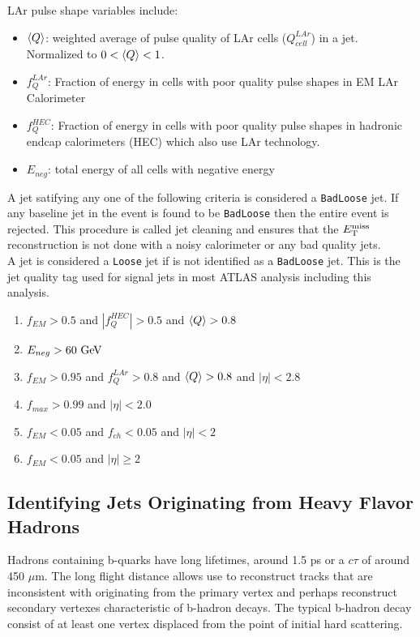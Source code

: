 \indent LAr pulse shape variables include: \\

\begin{itemize}
\item[] $\braket{Q}$: weighted average of pulse quality of LAr cells ($Q^{LAr}_{cell}$) in a jet.  Normalized to $0 < \braket{Q} < 1$.
\item[] $f^{LAr}_{Q}$: Fraction of energy in cells with poor quality pulse shapes in EM LAr Calorimeter
\item[] $f^{HEC}_{Q}$: Fraction of energy in cells with poor quality pulse shapes in hadronic endcap calorimeters (HEC) which also use LAr technology.
\item[] $E_{neg}$: total energy of all cells with negative energy
\end{itemize}

\indent A jet satifying any one of the following criteria is considered a {\tt BadLoose} jet.  If any baseline jet in the event is found to be {\tt BadLoose} then the entire event is rejected.  This procedure is called jet cleaning and ensures that the $E_{\mathrm{T}}^{\mathrm{miss}}$ reconstruction is not done with a noisy calorimeter or any bad quality jets.  \\

\indent A jet is considered a {\tt Loose} jet if is not identified as a {\tt BadLoose} jet.  This is the jet quality tag used for signal jets in most ATLAS analysis including this analysis. \\

\begin{enumerate}
\item[] $f_{EM} > 0.5$ and $|f^{HEC}_{Q}| > 0.5$ and $\braket{Q} > 0.8$
\item[] $E_{neg} > 60 \gev$
\item[] $f_{EM} > 0.95$ and $f^{LAr}_{Q} > 0.8$ and $\braket{Q}>0.8$ and $|\eta|<2.8$
\item[] $f_{max}>0.99$ and $|\eta|<2.0$
\item[] $f_{EM}<0.05$ and $f_{ch}<0.05$ and $|\eta|<2$
\item[] $f_{EM}<0.05$ and $|\eta|\ge2$
\end{enumerate}

\subsection{Identifying Jets Originating from Heavy Flavor Hadrons}
\label{sec:jet:btagging}

\indent Hadrons containing b-quarks have long lifetimes, around 1.5 ps or a $c\tau$ of around 450 $\mu$m.  The long flight distance allows use to reconstruct tracks that are inconsistent with originating from the primary vertex and perhaps reconstruct secondary vertexes characteristic of b-hadron decays.  The typical b-hadron decay consist of at least one vertex displaced from the point of initial hard scattering.  \\

